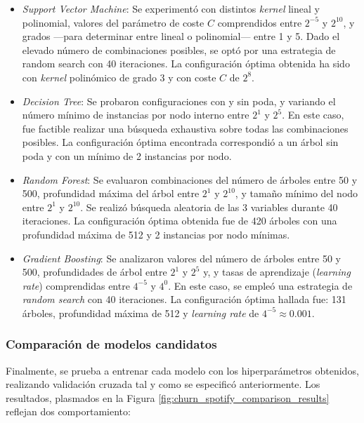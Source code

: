 \begin{itemize}
    
    \item \textit{Support Vector Machine}:
    Se experimentó con distintos \textit{kernel} lineal y polinomial, valores del parámetro de coste $C$ comprendidos entre $2^{-5}$ y $2^{10}$, y grados ---para determinar entre lineal o polinomial--- entre 1 y 5. Dado el elevado número de combinaciones posibles, se optó por una estrategia de random search con 40 iteraciones. La configuración óptima obtenida ha sido con \textit{kernel} polinómico de grado $3$ y con coste $C$ de $2^{8}$.

    \item \textit{Decision Tree}:
    Se probaron configuraciones con y sin poda, y variando el número mínimo de instancias por nodo interno entre $2^1$ y $2^5$. En este caso, fue factible realizar una búsqueda exhaustiva sobre todas las combinaciones posibles. La configuración óptima encontrada correspondió a un árbol sin poda y con un mínimo de 2 instancias por nodo.

    \item \textit{Random Forest}:
    Se evaluaron combinaciones del número de árboles entre 50 y 500, profundidad máxima del árbol entre $2^1$ y $2^{10}$, y tamaño mínimo del nodo entre $2^1$ y $2^{10}$. Se realizó búsqueda aleatoria de las 3 variables durante 40 iteraciones. La configuración óptima obtenida fue de 420 árboles con una profundidad máxima de 512 y 2 instancias por nodo mínimas.

    \item \textit{Gradient Boosting}:
    Se analizaron valores del número de árboles entre 50 y 500, profundidades de árbol entre $2^1$ y $2^5$ y, y tasas de aprendizaje (\textit{learning rate}) comprendidas entre $4^{-5}$ y $4^0$. En este caso, se empleó una estrategia de \textit{random search} con 40 iteraciones. La configuración óptima hallada fue: 131 árboles, profundidad máxima de 512 y \textit{learning rate} de $4^{-5} \approx 0.001$.

\end{itemize}


\subsubsection{Comparación de modelos candidatos}

Finalmente, se prueba a entrenar cada modelo con los hiperparámetros obtenidos, realizando validación cruzada tal y como se especificó anteriormente. Los resultados, plasmados en la Figura \ref{fig:churn_spotify_comparison_results} reflejan dos comportamiento: 

